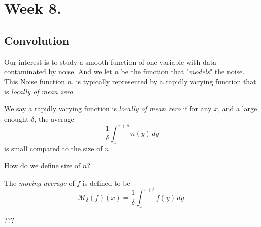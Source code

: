 \section{Week 8.}

\subsection{Convolution}

Our interest is to study a smooth function of one variable with data contaminated by noise. And we let $n$ be the function that "\textit{models}" the noise. This Noise function $n$, is typically represented by a rapidly varying function that is \textit{locally of mean zero}.
\begin{definition}
    We say a rapidly varying function is \textit{locally of mean zero} if for any $x$, and a large enought $\delta$, the average 
    \[\frac{1}{\delta}\int_{x}^{x+\delta} n(y)\,dy\]
    is small compared to the size of $n$.
\end{definition}

\begin{question}
    How do we define size of $n$?
\end{question}

\begin{definition}
    The \textit{moving average} of $f$ is defined to be 
    \[\mathcal M_{\delta}(f)(x)=\frac{1}{\delta}\int_{x}^{x+\delta}f(y)\,dy.\]
\end{definition}
    
???